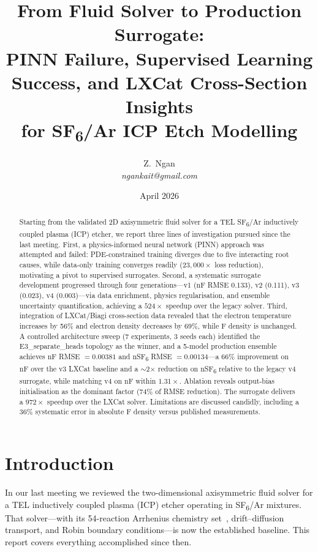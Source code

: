 \documentclass[12pt,a4paper]{article}
\title{%
  From Fluid Solver to Production Surrogate:\\
  PINN Failure, Supervised Learning Success,
  and LXCat Cross-Section Insights\\
  for SF\textsubscript{6}/Ar ICP Etch Modelling}
\author{%
  Z.\ Ngan \\
  \textit{ngankait@gmail.com}}
\date{April 2026}
\begin{document}
\maketitle

\begin{abstract}
Starting from the validated 2D axisymmetric fluid solver for a TEL
SF\textsubscript{6}/Ar inductively coupled plasma (ICP) etcher, we
report three lines of investigation pursued since the last meeting.
First, a physics-informed neural network (PINN) approach was attempted
and failed: PDE-constrained training diverges due to five interacting
root causes, while data-only training converges readily
($23{,}000\times$ loss reduction), motivating a pivot to supervised
surrogates.  Second, a systematic surrogate development progressed
through four generations---v1 (nF RMSE 0.133), v2 (0.111), v3
(0.023), v4 (0.003)---via data enrichment, physics regularisation, and
ensemble uncertainty quantification, achieving a $524\times$ speedup
over the legacy solver.  Third, integration of LXCat/Biagi
cross-section data revealed that the electron temperature increases by
56\% and electron density decreases by 69\%, while F density is
unchanged.  A controlled architecture sweep (7 experiments, 3 seeds
each) identified the E3\_separate\_heads topology as the winner, and a
5-model production ensemble achieves nF RMSE $= 0.00381$ and
nSF\textsubscript{6} RMSE $= 0.00134$---a 66\% improvement on nF over
the v3 LXCat baseline and a $\sim$2$\times$ reduction on
nSF\textsubscript{6} relative to the legacy v4 surrogate, while
matching v4 on nF within $1.31\times$.  Ablation reveals output-bias
initialisation as the dominant factor (74\% of RMSE reduction).  The
surrogate delivers a $972\times$ speedup over the LXCat solver.
Limitations are discussed candidly, including a 36\% systematic error
in absolute F density versus published measurements.
\end{abstract}

\newpage
\tableofcontents
\newpage

\section{Introduction}
\label{sec:intro}

In our last meeting we reviewed the two-dimensional axisymmetric fluid
solver for a TEL inductively coupled plasma (ICP) etcher operating in
SF\textsubscript{6}/Ar mixtures.  That solver---with its 54-reaction
Arrhenius chemistry set~\citep{lallement2009}, drift--diffusion
transport, and Robin boundary conditions---is now the established
baseline.  This report covers everything accomplished since then.
\end{document}
